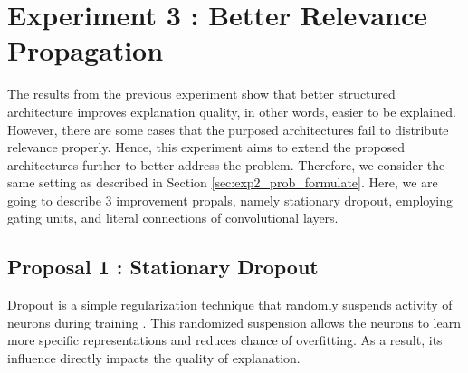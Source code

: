 \section{Experiment 3 : Better Relevance Propagation}
The results from the previous experiment show that better structured  architecture improves explanation quality, in other words, easier to be explained. However, there are some cases that the purposed architectures fail to distribute relevance properly.  Hence, this experiment aims to extend the proposed architectures further to better address the problem. Therefore, we consider the same setting as described in Section \ref{sec:exp2_prob_formulate}. Here, we are going to describe 3 improvement propals, namely stationary dropout, employing gating units,  and literal connections of convolutional layers.


\subsection{Proposal 1 :  Stationary Dropout}
Dropout is a simple regularization technique that randomly suspends activity of neurons during training\cite{SrivastavaDropoutSimpleWay2014} . This randomized suspension allows the neurons to learn more specific representations and reduces chance of overfitting.  As a result, its influence directly impacts the quality of explanation. 





\begin{figure}[!htb]
\centering
{} \\

\label{fig:dropout_lstm}
\end{figure}

